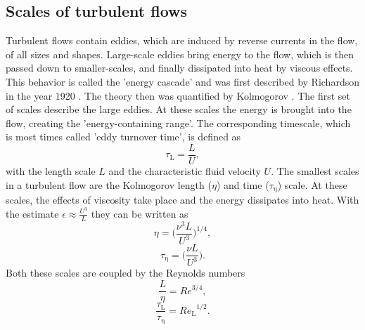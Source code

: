\documentclass[11pt,a4paper,openany,oneside,parskip=half*]{article}
\begin{document}
\subsection{Scales of turbulent flows}
Turbulent flows contain eddies, which are induced by reverse currents in the flow, of all sizes and shapes. Large-scale eddies bring energy to the flow, which is then passed down to smaller-scales, and finally dissipated into heat by viscous effects. This behavior is called the 'energy cascade' and was first described by Richardson in the year 1920 \cite{Richardson1920}. The theory then was quantified by Kolmogorov \cite{Kolmogorov1941}.%
\newline
The first set of scales describe the large eddies. At these scales the energy is brought into the flow, creating the 'energy-containing range'. The corresponding timescale, which is most times called 'eddy turnover time', is defined as
\begin{equation}
\tau_\mathrm{L} = \frac{L}{U},
\end{equation}
with the length scale $L$ and the characteristic fluid velocity $U$.
\newline
The smallest scales in a turbulent flow are the Kolmogorov length ($\eta$) and time ($\tau_\mathrm{\eta}$) scale. At these scales, the effects of viscosity take place and the energy dissipates into heat. With the estimate $\epsilon \approx \frac{U^3}{L} $ they can be written as
\begin{equation}
\eta = \biggl (\frac{\nu^3 L}{U^3} \biggl )^{1/4},
\end{equation}
\begin{equation}
\tau_\mathrm{\eta} = \biggl (\frac{\nu L}{U^3} \biggl ).
\end{equation}
Both these scales are coupled by the Reynolds numbers
\begin{equation}
\frac{L}{\eta} = Re^{3/4},
\end{equation}
\begin{equation}
\frac{\tau_\mathrm{L}}{\tau_\mathrm{\eta}} = {Re_\mathrm{L}}^{1/2}.
\end{equation}
\end{document}
